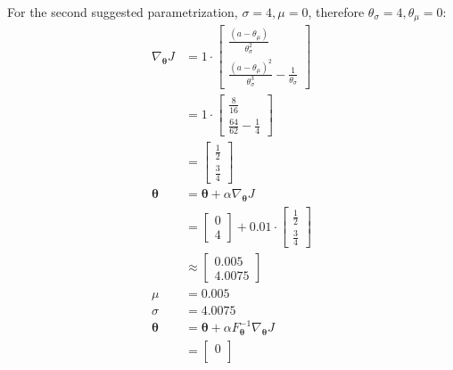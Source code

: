 \documentclass{exam}
\begin{document}
\begin{enumerate}
\begin{solutionorlines}[2in]
        For the second suggested parametrization, $\sigma = 4, \mu = 0$, therefore $\theta_{\sigma} = 4, \theta_{\mu} = 0$:
            \begin{align*}
                \nabla_{\boldsymbol{\theta}} J &= 1 \cdot \begin{bmatrix}
                 \frac{(a - \theta_{\mu})}{\theta_{\sigma}^2}\\
                \frac{(a - \theta_{\mu})^2}{\theta_{\sigma}^3} - \frac{1}{\theta_{\sigma}}
                \end{bmatrix}\\
                &= 1 \cdot \begin{bmatrix}
                \frac{8}{16}\\
                \frac{64}{62} - \frac{1}{4}
                \end{bmatrix}\\
                &= \begin{bmatrix}
                \frac{1}{2} \\
                \frac{3}{4}
                \end{bmatrix}\\
                \boldsymbol{\theta} &= \boldsymbol{\theta}  + \alpha  \nabla_{\boldsymbol{\theta}} J \tag{Vanilla policy gradient}\\ &= \begin{bmatrix}
                0\\
                4
                \end{bmatrix} + 0.01 \cdot  \begin{bmatrix}
                \frac{1}{2} \\
                \frac{3}{4}
                \end{bmatrix} \\
                &\approx \begin{bmatrix}
                0.005\\
                4.0075
                \end{bmatrix}\\
                \mu &= 0.005\\
                \sigma &= 4.0075\\
                \boldsymbol{\theta} &= \boldsymbol{\theta}  + \alpha F_{\boldsymbol{\theta}}^{-1}  \nabla_{\boldsymbol{\theta}} J \tag{Natural policy gradient}\\ 
                &= \begin{bmatrix}
                0\\

\end{bmatrix}
\end{align*}
\end{solutionorlines}
\end{enumerate}
\end{document}
